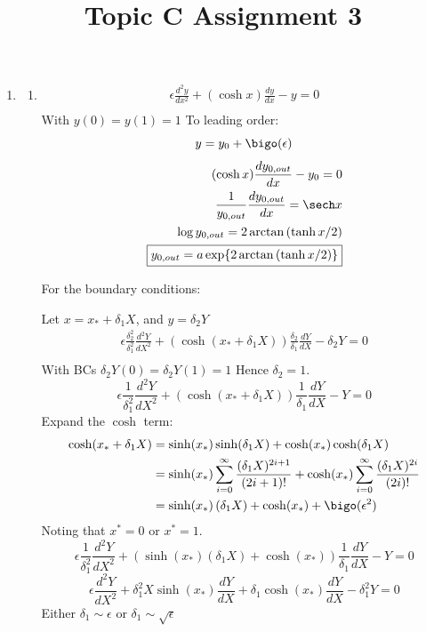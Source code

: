 \documentclass{X:/Documents/Coding/Latex/myassignment}
\title{Topic C Assignment 3}
\begin{document}
\maketitle
\begin{enumerate}
	\item \begin{enumerate}
		\item 
		\begin{align*}
			\epsilon \frac{d^2y}{dx^2} + (\cosh x) \frac{dy}{dx} - y= 0\\
		\end{align*}
		With $y(0)=y(1)=1$
		To leading order:
		\[y = y_0 + \bigo(\epsilon)\]
		\begin{align*}
			(\cosh x)\frac{dy_{0,out}}{dx} - y_0 = 0\\
			\frac{1}{y_{0,out}}\frac{dy_{0,out}}{dx} = \sech x \\
			\log y_{0,out} = 2\arctan\left(\tanh x/2\right)\\
			\boxed{y_{0,out} = a\exp\{2\arctan\left(\tanh x/2\right)\}}
		\end{align*}


		For the boundary conditions:
		
		Let $x = x_* + \delta_1 X$, and $y = \delta_2 Y$
		\begin{align*}
			\epsilon \frac{\delta_2^2}{\delta_1^2}\frac{d^2Y}{dX^2} + (\cosh(x_* + \delta_1 X))\frac{\delta_2}{\delta_1} \frac{dY}{dX} - \delta_2 Y= 0\\
		\end{align*}
		With BCs $\delta_2 Y(0) = \delta_2 Y(1) = 1$ Hence $\delta_2 = 1$.
		\[\epsilon \frac{1}{\delta_1^2}\frac{d^2Y}{dX^2} + (\cosh(x_* + \delta_1 X))\frac1{\delta_1} \frac{dY}{dX} - Y= 0\]
		Expand the $\cosh$ term:
		\begin{align*}
			\cosh (x_*+\delta_1 X) &= \sinh(x_*)\sinh(\delta_1X)+\cosh(x_*)\cosh(\delta_1X) \\
			&=\sinh(x_*)\sum_{i=0}^\infty \frac{(\delta_1 X)^{2i+1}}{(2i+1)!}   + \cosh(x_*)\sum_{i=0}^\infty \frac{(\delta_1 X)^{2i}}{(2i)!}\\
			&= \sinh(x_*)\left(\delta_1 X\right) + \cosh(x_*) + \bigo(\epsilon^2) 
		\end{align*}
		Noting that $x^* = 0$ or $x^* =1$.
		\[\epsilon \frac{1}{\delta_1^2}\frac{d^2Y}{dX^2} + (\sinh(x_*)\left(\delta_1 X\right) + \cosh(x_*))\frac1{\delta_1} \frac{dY}{dX} - Y= 0\]
		\[\epsilon\frac{d^2Y}{dX^2} +  \delta_1^2 X \sinh(x_*)\frac{dY}{dX} + \delta_1\cosh(x_*)\frac{dY}{dX} - \delta_1^2 Y= 0\]
		Either $\delta_1 \sim \epsilon$ or $\delta_1 \sim \sqrt{\epsilon}$


\end{enumerate}
\end{enumerate}
\end{document}
